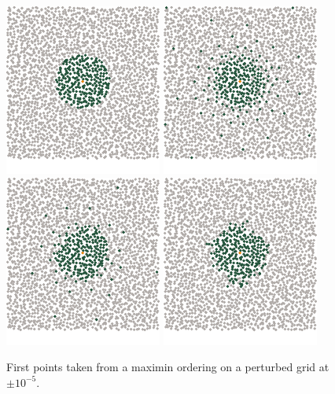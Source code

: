 \documentclass[review,supplement,onefignum,onetabnum]{siamonline220329}
\begin{document}
\begin{figure}[H]
  \centering
  \includegraphics{figures/precompiled/maximin_1e-5/points_1.pdf}%
  \quad
  \includegraphics{figures/precompiled/maximin_1e-5/points_2.pdf}%
  \quad
  \includegraphics{figures/precompiled/maximin_1e-5/points_3.pdf}%
  \quad
  \includegraphics{figures/precompiled/maximin_1e-5/points_4.pdf}%
  \caption{%
    First points taken from a maximin ordering
    on a perturbed grid at \( \pm 10^{-5} \).
  }
\end{figure}
\end{document}
